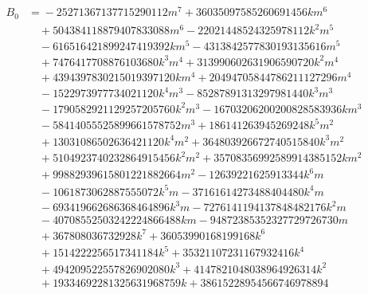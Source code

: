 \documentclass[11pt,reqno,letterpaper]{amsart}
\theoremstyle{definition}
\numberwithin{equation}{section}
\begin{document}
\begin{align*}
B_0&={}-25271367137715290112 m^{7} + 36035097585260691456 k m^{6}\\
&\quad{} + 504384118879407833088 m^{6} - 22021448524325978112 k^{2} m^{5}\\
&\quad{} - 616516421899247419392 k m^{5} - 4313842577830193135616 m^{5}\\
&\quad{} + 7476417708876103680 k^{3} m^{4} + 313990602631906590720 k^{2} m^{4}\\
&\quad{} + 4394397830215019397120 k m^{4} + 20494705844786211127296 m^{4}\\
&\quad{} - 1522973977734021120 k^{4} m^{3} - 85287891313297981440 k^{3} m^{3}\\
&\quad{} - 1790582921129257205760 k^{2} m^{3} - 16703206200200828583936 k m^{3}\\
&\quad{} - 58414055525899661578752 m^{3} + 186141263945269248 k^{5} m^{2}\\
&\quad{} + 13031086502636421120 k^{4} m^{2} + 364803926672740515840 k^{3} m^{2}\\
&\quad{} + 5104923740232864915456 k^{2} m^{2} + 35708356992589914385152 k m^{2}\\
&\quad{} + 99882939615801221882664 m^{2} - 12639221625913344 k^{6} m\\
&\quad{} - 1061873062887555072 k^{5} m - 37161614273488404480 k^{4} m\\
&\quad{} - 693419662686368464896 k^{3} m - 7276141194137848482176 k^{2} m\\
&\quad{} - 40708552503242224866488 k m - 94872385352327729726730 m\\
&\quad{} + 367808036732928 k^{7} + 36053990168199168 k^{6}\\
&\quad{} + 1514222256517341184 k^{5} + 35321107231167932416 k^{4}\\
&\quad{} + 494209522557826902080 k^{3} + 4147821048038964926314 k^{2}\\
&\quad{} + 19334692281325631968759 k + 38615228954566746978894
\end{align*}

\clearpage
\end{document}
